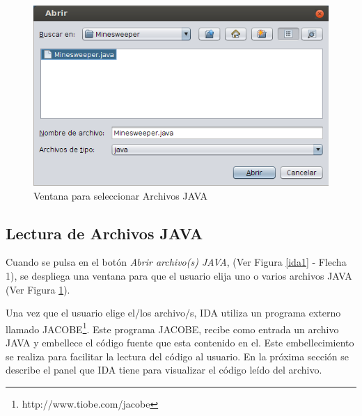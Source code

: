 \begin{figure}[t] %
\centerline{%
\includegraphics[scale= 0.7]{./cap4/ida_02.png}
}
\caption{Ventana para seleccionar Archivos JAVA}
\label{ida2}
\end{figure}

\vspace{-1em}

\subsection{Lectura de Archivos JAVA}

Cuando se pulsa en el botón \textit{Abrir archivo(s) JAVA}, (Ver Figura \ref{ida1} - Flecha 1), se despliega una ventana para que el usuario elija uno o varios archivos JAVA (Ver Figura \ref{ida2}). 


Una vez que el usuario elige el/los archivo/s, IDA utiliza un  programa externo llamado JACOBE\footnote[1]{http://www.tiobe.com/jacobe}. Este programa JACOBE, recibe como entrada un archivo JAVA y embellece el código fuente que esta contenido en el. Este embellecimiento se realiza para facilitar la lectura del código al usuario. En la próxima sección se describe el panel que IDA tiene para visualizar el código leído del archivo.


